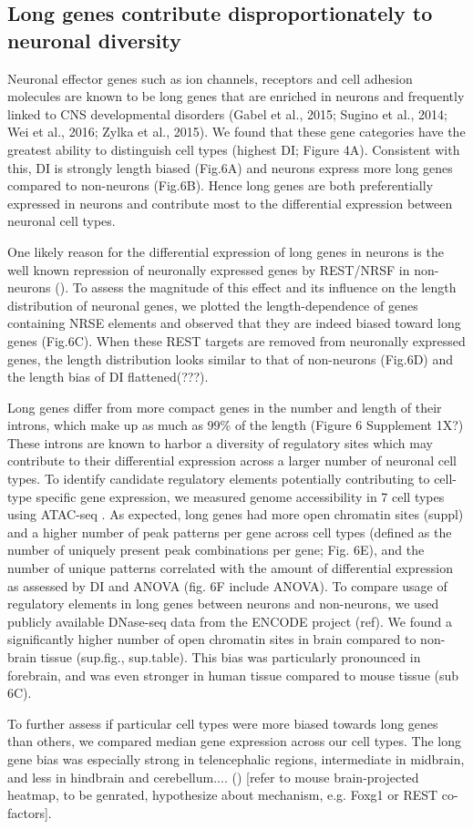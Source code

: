\subsection{Long genes contribute disproportionately to neuronal diversity}

Neuronal effector genes such as ion channels, receptors and cell adhesion molecules are known to be long genes that are enriched in neurons and frequently linked to CNS developmental disorders (Gabel et al., 2015; Sugino et al., 2014; Wei et al., 2016; Zylka et al., 2015). We found that these gene categories have the greatest ability to distinguish cell types (highest DI; Figure 4A). Consistent with this, DI is strongly length biased (Fig.6A) and neurons express more long genes compared to non-neurons (Fig.6B). Hence long genes are both preferentially expressed in neurons and contribute most to the differential expression between neuronal cell types. 

One likely reason for the differential expression of long genes in neurons is the well known repression of neuronally expressed genes by REST/NRSF in non-neurons (). To assess the magnitude of this effect and its influence on the length distribution of neuronal genes, we plotted the length-dependence of genes containing NRSE elements and observed that they are indeed biased toward long genes (Fig.6C). When these REST targets are removed from neuronally expressed genes, the length distribution looks similar to that of non-neurons (Fig.6D) and the length bias of DI flattened(???).


Long genes differ from more compact genes in the number and length of their introns, which make up as much as 99\% of the length (Figure 6 Supplement 1X?) These introns are known to harbor a diversity of regulatory sites which may contribute to their differential expression across a larger number of neuronal cell types. To identify candidate regulatory elements potentially contributing to cell-type specific gene expression, we measured genome accessibility in 7 cell types using ATAC-seq . As expected, long genes had more open chromatin sites (suppl) and a higher number of peak patterns per gene across cell types (defined as the number of uniquely present peak combinations per gene;  Fig. 6E), and the number of unique patterns correlated with the amount of differential expression as assessed by DI and ANOVA (fig. 6F include ANOVA).
To compare usage of regulatory elements in long genes between neurons and non-neurons, we used publicly available DNase-seq data from the ENCODE project (ref). We found a significantly higher number of open chromatin sites in brain compared to non-brain tissue (sup.fig., sup.table). This bias was  particularly pronounced in forebrain, and was even stronger in human tissue compared to mouse tissue (sub 6C).

To further assess if particular cell types were more biased towards long genes than others, we compared median gene expression across our cell types. The long gene bias was especially strong in telencephalic regions, intermediate in midbrain, and less in hindbrain and cerebellum.... () [refer to mouse brain-projected heatmap, to be genrated, hypothesize about mechanism, e.g. Foxg1 or REST co-factors].